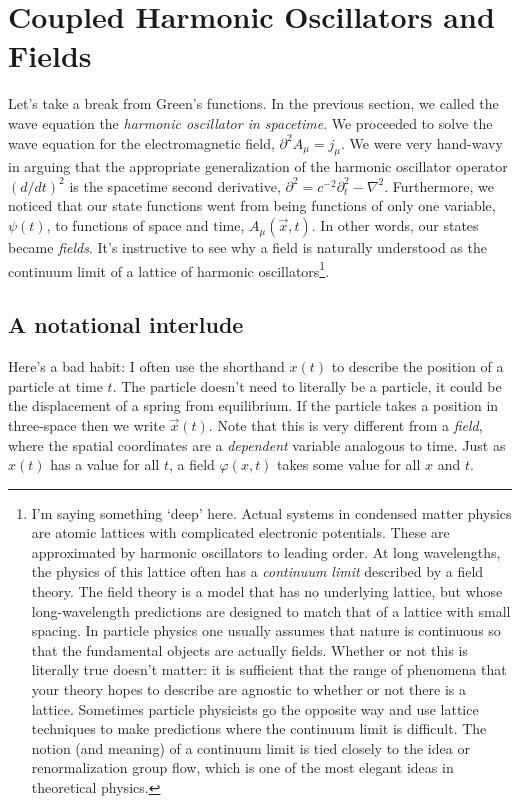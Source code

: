 \section{Coupled Harmonic Oscillators and Fields}
\label{sec:CHO:fields}

Let's take a break from Green's functions. In the previous section, we called the wave equation the \emph{harmonic oscillator in spacetime}. We proceeded to solve the wave equation for the electromagnetic field, $\partial^2 A_\mu = j_\mu$. We were very hand-wavy in arguing that the appropriate generalization of the harmonic oscillator operator $(d/dt)^2$ is the spacetime second derivative, $\partial^2 = c^{-2}\partial_t^2 - \nabla^2$. Furthermore, we noticed that our state functions went from being functions of only one variable, $\psi(t)$, to functions of space and time, $A_\mu(\vec{x},t)$. In other words, our states became \emph{fields}. It's instructive to see why a field is naturally understood as the continuum limit of a lattice of harmonic oscillators\footnote{I'm saying something `deep' here. Actual systems in condensed matter physics are atomic lattices with complicated electronic potentials. These are approximated by harmonic oscillators to leading order. At long wavelengths, the physics of this lattice often has a \emph{continuum limit} described by a field theory. The field theory is a model that has no underlying lattice, but whose long-wavelength predictions are designed to match that of a lattice with small spacing. In particle physics one usually assumes that nature is continuous so that the fundamental objects are actually fields. Whether or not this is literally true doesn't matter: it is sufficient that the range of phenomena that your theory hopes to describe are agnostic to whether or not there is a lattice. Sometimes particle physicists go the opposite way and use lattice techniques to make predictions where the continuum limit is difficult. The notion (and meaning) of a continuum limit is tied closely to the idea or renormalization group flow, which is one of the most elegant ideas in theoretical physics.}.


\subsection{A notational interlude}

Here's a bad habit: I often use the shorthand $x(t)$ to describe the position of a particle at time $t$. The particle doesn't need to literally be a particle, it could be the displacement of a spring from equilibrium. If the particle takes a position in three-space then we write $\vec{x}(t)$. Note that this is very different from a \emph{field}, where the spatial coordinates are a \emph{dependent} variable analogous to time. Just as $x(t)$ has a value for all $t$, a field $\varphi(x,t)$ takes some value for all $x$ and $t$. 

